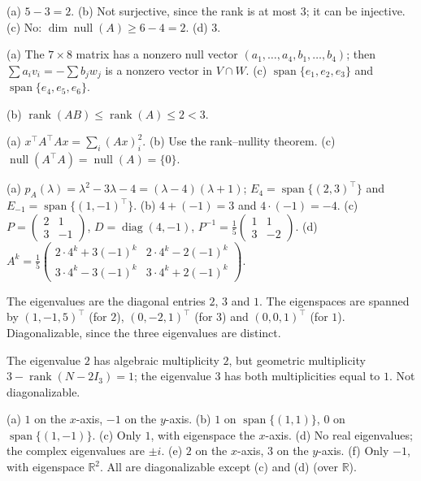 \documentclass[11pt]{article}
\theoremstyle{definition}
\DeclareMathOperator{\rank}{rank}
\DeclareMathOperator{\Null}{null}
\DeclareMathOperator{\Span}{span}
\DeclareMathOperator{\diag}{diag}
\begin{document}
\begin{description}[leftmargin=0pt, itemsep=0.3em]
    \item[\ref{pr:onto}.] (a) $5 - 3 = 2$. (b) Not surjective, since the rank is at most $3$; it can be injective. (c) No: $\dim \Null(A) \geq 6 - 4 = 2$. (d) $3$.
    \item[\ref{pr:intersect}.] (a) The $7 \times 8$ matrix has a nonzero null vector $(a_1, \ldots, a_4, b_1, \ldots, b_4)$; then $\sum a_i v_i = -\sum b_j w_j$ is a nonzero vector in $V \cap W$. (c) $\Span\{e_1, e_2, e_3\}$ and $\Span\{e_4, e_5, e_6\}$.
    \item[\ref{pr:rankAB}.] (b) $\rank(AB) \leq \rank(A) \leq 2 < 3$.
    \item[\ref{pr:ATA}.] (a) $x^\top A^\top A x = \sum_i (Ax)_i^2$. (b) Use the rank--nullity theorem. (c) $\Null(A^\top A) = \Null(A) = \{0\}$.
    \item[\ref{pr:eig2}.] (a) $p_A(\lambda) = \lambda^2 - 3\lambda - 4 = (\lambda - 4)(\lambda + 1)$; $E_4 = \Span\{(2, 3)^\top\}$ and $E_{-1} = \Span\{(1, -1)^\top\}$. (b) $4 + (-1) = 3$ and $4 \cdot (-1) = -4$. (c) $P = \begin{pmatrix} 2 & 1 \\ 3 & -1 \end{pmatrix}$, $D = \diag(4, -1)$, $P^{-1} = \frac{1}{5}\begin{pmatrix} 1 & 1 \\ 3 & -2 \end{pmatrix}$. (d) $A^k = \frac{1}{5}\begin{pmatrix} 2 \cdot 4^k + 3(-1)^k & 2 \cdot 4^k - 2(-1)^k \\ 3 \cdot 4^k - 3(-1)^k & 3 \cdot 4^k + 2(-1)^k \end{pmatrix}$.
    \item[\ref{pr:eig-triangular}.] The eigenvalues are the diagonal entries $2$, $3$ and $1$. The eigenspaces are spanned by $(1, -1, 5)^\top$ (for $2$), $(0, -2, 1)^\top$ (for $3$) and $(0, 0, 1)^\top$ (for $1$). Diagonalizable, since the three eigenvalues are distinct.
    \item[\ref{pr:eig-defective}.] The eigenvalue $2$ has algebraic multiplicity $2$, but geometric multiplicity $3 - \rank(N - 2I_3) = 1$; the eigenvalue $3$ has both multiplicities equal to $1$. Not diagonalizable.
    \item[\ref{pr:eig-geometric}.] (a) $1$ on the $x$-axis, $-1$ on the $y$-axis. (b) $1$ on $\Span\{(1, 1)\}$, $0$ on $\Span\{(1, -1)\}$. (c) Only $1$, with eigenspace the $x$-axis. (d) No real eigenvalues; the complex eigenvalues are $\pm i$. (e) $2$ on the $x$-axis, $3$ on the $y$-axis. (f) Only $-1$, with eigenspace $\mathbb{R}^2$. All are diagonalizable except (c) and (d) (over $\mathbb{R}$).

\end{description}
\end{document}
